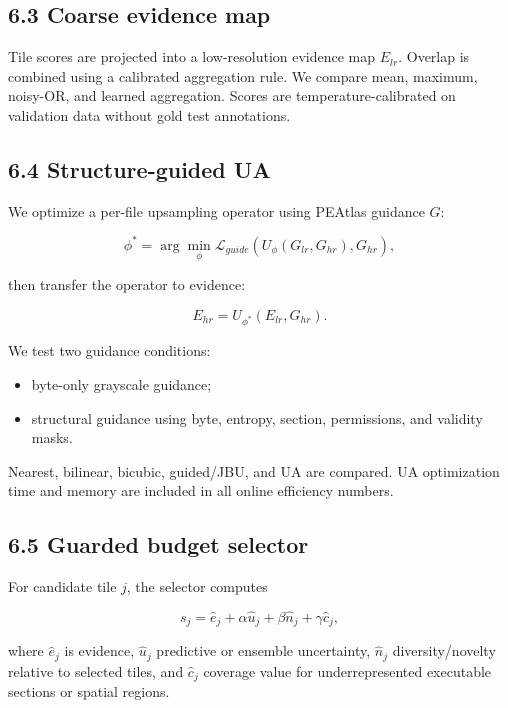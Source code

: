 \documentclass[
  10pt,
]{article}
\providecommand{\tightlist}{%
  \setlength{\itemsep}{0pt}\setlength{\parskip}{0pt}}
\begin{document}
\subsection{6.3 Coarse evidence map}\label{coarse-evidence-map}

Tile scores are projected into a low-resolution evidence map \(E_{lr}\).
Overlap is combined using a calibrated aggregation rule. We compare
mean, maximum, noisy-OR, and learned aggregation. Scores are
temperature-calibrated on validation data without gold test annotations.

\subsection{6.4 Structure-guided UA}\label{structure-guided-ua}

We optimize a per-file upsampling operator using PEAtlas guidance \(G\):

\[
\phi^* = \arg\min_\phi \mathcal{L}_{guide}(U_\phi(G_{lr},G_{hr}),G_{hr}),
\]

then transfer the operator to evidence:

\[
E_{hr}=U_{\phi^*}(E_{lr},G_{hr}).
\]

We test two guidance conditions:

\begin{itemize}
\tightlist
\item
  byte-only grayscale guidance;
\item
  structural guidance using byte, entropy, section, permissions, and
  validity masks.
\end{itemize}

Nearest, bilinear, bicubic, guided/JBU, and UA are compared. UA
optimization time and memory are included in all online efficiency
numbers.

\subsection{6.5 Guarded budget selector}\label{guarded-budget-selector}

For candidate tile \(j\), the selector computes

\[
s_j = \hat e_j + \alpha \hat u_j + \beta \hat n_j + \gamma \hat c_j,
\]

where \(\hat e_j\) is evidence, \(\hat u_j\) predictive or ensemble
uncertainty, \(\hat n_j\) diversity/novelty relative to selected tiles,
and \(\hat c_j\) coverage value for underrepresented executable sections
or spatial regions.
\end{document}
